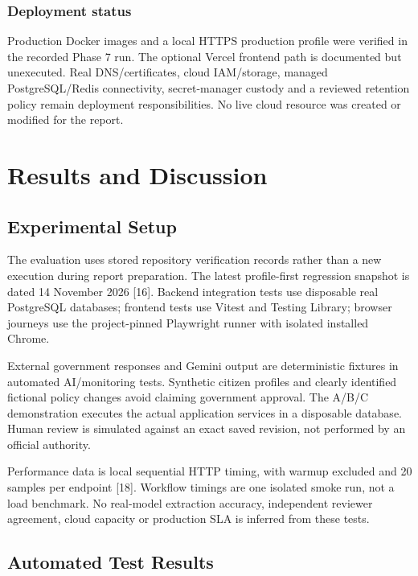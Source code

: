 \documentclass[12pt,a4paper,twoside]{report}
\begin{document}
\subsection*{Deployment status}

Production Docker images and a local HTTPS production profile were verified in the recorded Phase 7 run. The optional Vercel frontend path is documented but unexecuted. Real DNS/certificates, cloud IAM/storage, managed PostgreSQL/Redis connectivity, secret-manager custody and a reviewed retention policy remain deployment responsibilities. No live cloud resource was created or modified for the report.

\clearpage\chapter{Results and Discussion}

\section{Experimental Setup}

The evaluation uses stored repository verification records rather than a new execution during report preparation. The latest profile-first regression snapshot is dated 14 November 2026 [16]. Backend integration tests use disposable real PostgreSQL databases; frontend tests use Vitest and Testing Library; browser journeys use the project-pinned Playwright runner with isolated installed Chrome.

External government responses and Gemini output are deterministic fixtures in automated AI/monitoring tests. Synthetic citizen profiles and clearly identified fictional policy changes avoid claiming government approval. The A/B/C demonstration executes the actual application services in a disposable database. Human review is simulated against an exact saved revision, not performed by an official authority.

Performance data is local sequential HTTP timing, with warmup excluded and 20 samples per endpoint [18]. Workflow timings are one isolated smoke run, not a load benchmark. No real-model extraction accuracy, independent reviewer agreement, cloud capacity or production SLA is inferred from these tests.

\section{Automated Test Results}
\end{document}
